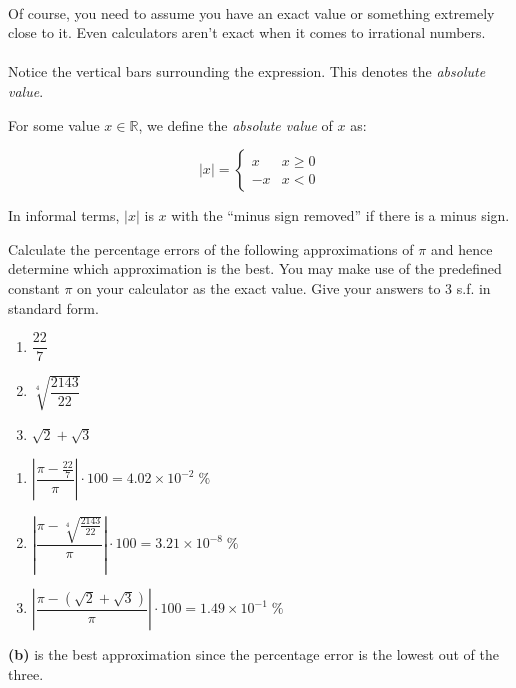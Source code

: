 \documentclass[12pt, a4paper, titlepage, twoside]{article}
\newcommand*{\R}{\mathbb{R}}
\newcounter{excount}[subsection]
\begin{document}
	\paragraph{}
	Of course, you need to assume you have an exact value or something extremely close to it. Even calculators aren't
	exact when it comes to irrational numbers.
	
	\paragraph{}
	Notice the vertical bars surrounding the expression. This denotes the \textit{absolute value}.\\
	
	\begin{kp}
		For some value $x \in \R$, we define the \textit{absolute value} of $x$ as:
		
		$$|x| = 
		\begin{cases} 
			x & x \geqslant 0\\
			-x & x < 0
		\end{cases}$$
		
		In informal terms, $|x|$ is $x$ with the ``minus sign removed'' if there is a minus sign.
	\end{kp}
	
	\hfill
	
	\begin{ex}
		Calculate the percentage errors of the following approximations of $\pi$ and hence determine which approximation 
		is the best. You may make use of the predefined constant $\pi$ on your calculator as the exact value. Give your answers to
		3 s.f. in standard form.
		
		\begin{multicols}{3}
			\begin{enumerate}[label=\textbf{(\alph*)}]
				\item $\dfrac{22}{7}$
				\item $\sqrt[4]{\dfrac{2143}{22}}$
				\item $\sqrt{2} + \sqrt{3}$
			\end{enumerate}
		\end{multicols}
		
		\tcbline
		\hfill
		
		\begin{enumerate}[label=\textbf{(\alph*)}]
			\item $\left\lvert \dfrac{\pi - \frac{22}{7}}{\pi} \right\rvert \cdot 100 = 4.02 \times 10^{-2} \; \%$
			\item $\left\lvert \dfrac{\pi - \sqrt[4]{\frac{2143}{22}}}{\pi}\right\rvert \cdot 100 = 3.21 \times 10^{-8} \; \%$
			\item $\left\lvert \dfrac{\pi - (\sqrt{2} + \sqrt{3})}{\pi}\right\rvert \cdot 100 = 1.49 \times 10^{-1} \; \%$
		\end{enumerate}
		\hfill
		
		\textbf{(b)} is the best approximation since the percentage error is the lowest out of the three.
	\end{ex}
	
\end{document}
